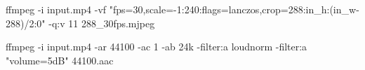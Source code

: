 ffmpeg -i input.mp4 -vf "fps=30,scale=-1:240:flags=lanczos,crop=288:in_h:(in_w-288)/2:0" -q:v 11 288_30fps.mjpeg

ffmpeg -i input.mp4 -ar 44100 -ac 1 -ab 24k -filter:a loudnorm -filter:a "volume=5dB" 44100.aac
